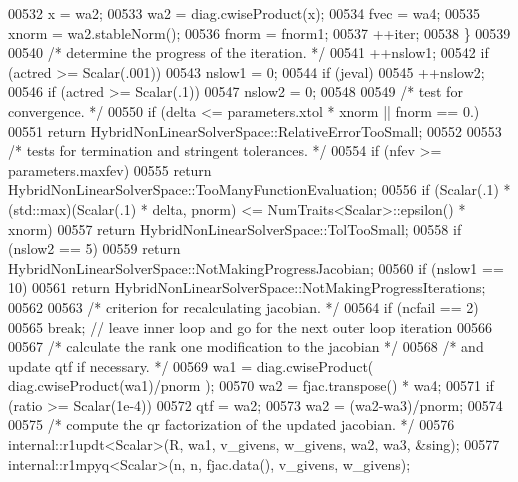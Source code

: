 \begin{DoxyCode}
00532             x = wa2;
00533             wa2 = diag.cwiseProduct(x);
00534             fvec = wa4;
00535             xnorm = wa2.stableNorm();
00536             fnorm = fnorm1;
00537             ++iter;
00538         \}
00539 
00540         \textcolor{comment}{/* determine the progress of the iteration. */}
00541         ++nslow1;
00542         \textcolor{keywordflow}{if} (actred >= Scalar(.001))
00543             nslow1 = 0;
00544         \textcolor{keywordflow}{if} (jeval)
00545             ++nslow2;
00546         \textcolor{keywordflow}{if} (actred >= Scalar(.1))
00547             nslow2 = 0;
00548 
00549         \textcolor{comment}{/* test for convergence. */}
00550         \textcolor{keywordflow}{if} (delta <= parameters.xtol * xnorm || fnorm == 0.)
00551             \textcolor{keywordflow}{return} HybridNonLinearSolverSpace::RelativeErrorTooSmall;
00552 
00553         \textcolor{comment}{/* tests for termination and stringent tolerances. */}
00554         \textcolor{keywordflow}{if} (nfev >= parameters.maxfev)
00555             \textcolor{keywordflow}{return} HybridNonLinearSolverSpace::TooManyFunctionEvaluation;
00556         \textcolor{keywordflow}{if} (Scalar(.1) * (std::max)(Scalar(.1) * delta, pnorm) <= NumTraits<Scalar>::epsilon() * xnorm)
00557             \textcolor{keywordflow}{return} HybridNonLinearSolverSpace::TolTooSmall;
00558         \textcolor{keywordflow}{if} (nslow2 == 5)
00559             \textcolor{keywordflow}{return} HybridNonLinearSolverSpace::NotMakingProgressJacobian;
00560         \textcolor{keywordflow}{if} (nslow1 == 10)
00561             \textcolor{keywordflow}{return} HybridNonLinearSolverSpace::NotMakingProgressIterations;
00562 
00563         \textcolor{comment}{/* criterion for recalculating jacobian. */}
00564         \textcolor{keywordflow}{if} (ncfail == 2)
00565             \textcolor{keywordflow}{break}; \textcolor{comment}{// leave inner loop and go for the next outer loop iteration}
00566 
00567         \textcolor{comment}{/* calculate the rank one modification to the jacobian */}
00568         \textcolor{comment}{/* and update qtf if necessary. */}
00569         wa1 = diag.cwiseProduct( diag.cwiseProduct(wa1)/pnorm );
00570         wa2 = fjac.transpose() * wa4;
00571         \textcolor{keywordflow}{if} (ratio >= Scalar(1e-4))
00572             qtf = wa2;
00573         wa2 = (wa2-wa3)/pnorm;
00574 
00575         \textcolor{comment}{/* compute the qr factorization of the updated jacobian. */}
00576         internal::r1updt<Scalar>(R, wa1, v\_givens, w\_givens, wa2, wa3, &sing);
00577         internal::r1mpyq<Scalar>(n, n, fjac.data(), v\_givens, w\_givens);

\end{DoxyCode}
